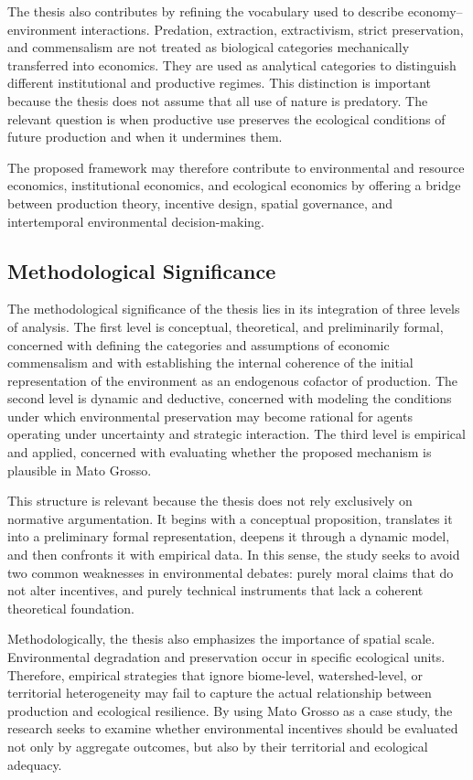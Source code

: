 The thesis also contributes by refining the vocabulary used to describe economy--environment interactions. Predation, extraction, extractivism, strict preservation, and commensalism are not treated as biological categories mechanically transferred into economics. They are used as analytical categories to distinguish different institutional and productive regimes. This distinction is important because the thesis does not assume that all use of nature is predatory. The relevant question is when productive use preserves the ecological conditions of future production and when it undermines them.

The proposed framework may therefore contribute to environmental and resource economics, institutional economics, and ecological economics by offering a bridge between production theory, incentive design, spatial governance, and intertemporal environmental decision-making.

\subsection{Methodological Significance}

The methodological significance of the thesis lies in its integration of three levels of analysis. The first level is conceptual, theoretical, and preliminarily formal, concerned with defining the categories and assumptions of economic commensalism and with establishing the internal coherence of the initial representation of the environment as an endogenous cofactor of production. The second level is dynamic and deductive, concerned with modeling the conditions under which environmental preservation may become rational for agents operating under uncertainty and strategic interaction. The third level is empirical and applied, concerned with evaluating whether the proposed mechanism is plausible in Mato Grosso.

This structure is relevant because the thesis does not rely exclusively on normative argumentation. It begins with a conceptual proposition, translates it into a preliminary formal representation, deepens it through a dynamic model, and then confronts it with empirical data. In this sense, the study seeks to avoid two common weaknesses in environmental debates: purely moral claims that do not alter incentives, and purely technical instruments that lack a coherent theoretical foundation.

Methodologically, the thesis also emphasizes the importance of spatial scale. Environmental degradation and preservation occur in specific ecological units. Therefore, empirical strategies that ignore biome-level, watershed-level, or territorial heterogeneity may fail to capture the actual relationship between production and ecological resilience. By using Mato Grosso as a case study, the research seeks to examine whether environmental incentives should be evaluated not only by aggregate outcomes, but also by their territorial and ecological adequacy.

